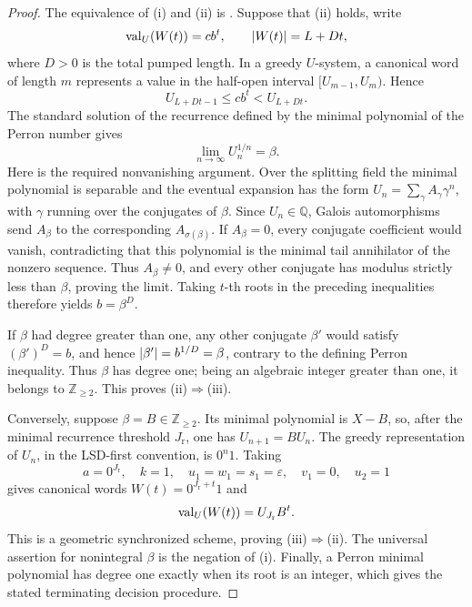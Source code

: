 \begin{proof}
  The equivalence of \textup{(i)} and \textup{(ii)} is
  .  Suppose that
  \textup{(ii)} holds, write
  \[
    \operatorname{val}_U(W(t))=cb^t,
    \qquad \lvert W(t) \rvert=L+Dt,
  \]
  where \(D>0\) is the total pumped length.  In a greedy \(U\)-system, a
  canonical word of length \(m\) represents a value in the half-open interval
  \([U_{m-1},U_m)\).  Hence
  \[
    U_{L+Dt-1}\le cb^t<U_{L+Dt}.
  \]
  The standard solution of the recurrence defined by the minimal polynomial
  of the Perron number gives
  \[
    \lim_{n\to\infty}U_n^{1/n}=\beta.
  \]
  Here is the required nonvanishing argument. Over the splitting field the
  minimal polynomial is separable and the eventual expansion has the form
  \(U_n=\sum_\gamma A_\gamma\gamma^n\), with \(\gamma\) running over the
  conjugates of \(\beta\). Since \(U_n\in\mathbb Q\), Galois automorphisms
  send \(A_\beta\) to the corresponding \(A_{\sigma(\beta)}\). If
  \(A_\beta=0\), every conjugate coefficient would vanish, contradicting
  that this polynomial is the minimal tail annihilator of the nonzero
  sequence. Thus \(A_\beta\ne0\), and every other conjugate has modulus
  strictly less than \(\beta\), proving the limit. Taking
  \(t\)-th roots in the preceding inequalities therefore yields
  \(b=\beta^D\).

  If \(\beta\) had degree greater than one, any other conjugate
  \(\beta'\) would satisfy \((\beta')^D=b\), and hence
  \(\lvert \beta' \rvert=b^{1/D}=\beta\), contrary to the defining Perron
  inequality.  Thus \(\beta\) has degree one; being an algebraic integer
  greater than one, it belongs to \(\mathbb Z_{\ge2}\).  This proves
  \textup{(ii)}\(\Rightarrow\)\textup{(iii)}.

  Conversely, suppose \(\beta=B\in\mathbb Z_{\ge2}\).  Its minimal
  polynomial is \(X-B\), so, after the minimal recurrence threshold
  \(J_{\mathrm r}\), one has \(U_{n+1}=BU_n\).  The greedy representation
  of \(U_n\), in the LSD-first convention, is \(0^n1\).  Taking
  \[
    a=0^{J_{\mathrm r}},\quad k=1,\quad
    u_1=w_1=s_1=\varepsilon,\quad v_1=0,\quad u_2=1
  \]
  gives canonical words \(W(t)=0^{J_{\mathrm r}+t}1\) and
  \[
    \operatorname{val}_U(W(t))=U_{J_{\mathrm r}}B^t.
  \]
  This is a geometric synchronized scheme, proving
  \textup{(iii)}\(\Rightarrow\)\textup{(ii)}.  The universal assertion
  for nonintegral \(\beta\) is the negation of \textup{(i)}.  Finally, a
  Perron minimal polynomial has degree one exactly when its root is an
  integer, which gives the stated terminating decision procedure.
\end{proof}

